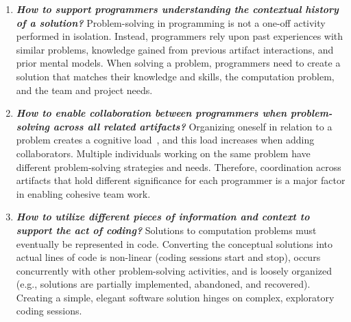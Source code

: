 \begin{enumerate}
  \item \textit{\textbf{How to support programmers understanding the contextual history of a solution?}}
  Problem-solving in programming is not a one-off activity performed in isolation.
  Instead, programmers rely upon past experiences with similar problems, knowledge gained from previous artifact interactions, and prior mental models.%
  When solving a problem, programmers need to create a solution that matches their knowledge and skills, the computation problem, and the team and project needs.
  
  \item \textit{\textbf{How to enable collaboration between programmers when problem-solving across all related artifacts?}}
  Organizing oneself in relation to a problem creates a cognitive load~\cite{sweller1988cognitive}, and this load increases when adding collaborators.
  Multiple individuals working on the same problem have different problem-solving strategies and needs.
 Therefore, coordination across artifacts that hold different significance for each programmer is a major factor in enabling cohesive team work.
  
  \item \textit{\textbf{How to utilize different pieces of information and context to support the act of coding?}}
  Solutions to computation problems must eventually be represented in code.
  Converting the conceptual solutions into actual lines of code is non-linear (coding sessions start and stop), occurs concurrently with other problem-solving activities, and is loosely organized (e.g., solutions are partially implemented, abandoned, and recovered).
Creating a simple, elegant software solution hinges on complex, exploratory coding sessions.

\end{enumerate}
